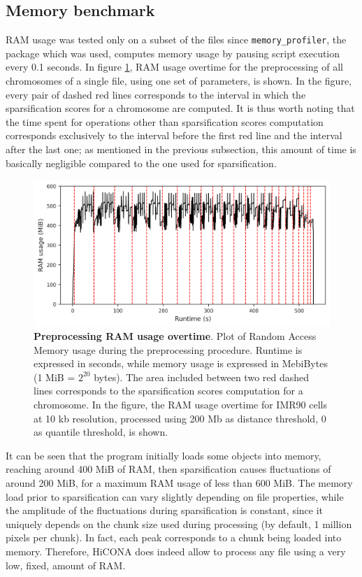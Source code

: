\subsection{Memory benchmark}

RAM usage was tested only on a subset of the files since \texttt{memory\_profiler}, the package which was used, computes memory usage by pausing script execution every 0.1 seconds. In figure \ref{fig:memorybenchmark}, RAM usage overtime for the preprocessing of all chromosomes of a single file, using one set of parameters, is shown. In the figure, every pair of dashed red lines corresponds to the interval in which the sparsification scores for a chromosome are computed. It is thus worth noting that the time spent for operations other than sparsification scores computation corresponds exclusively to the interval before the first red line and the interval after the last one; as mentioned in the previous subsection, this amount of time is basically negligible compared to the one used for sparsification.

\begin{figure}[h]
  \centering 
  \includegraphics[width=1\textwidth]{memory_benchmark.png}
  \caption{\textbf{Preprocessing RAM usage overtime}. Plot of Random Access Memory usage during the preprocessing procedure. Runtime is expressed in seconds, while memory usage is expressed in MebiBytes (1 MiB = $2^{20}$ bytes). The area included between two red dashed lines corresponds to the sparsification scores computation for a chromosome. In the figure, the RAM usage overtime for IMR90 cells at 10 kb resolution, processed using 200 Mb as distance threshold, 0 as quantile threshold, is shown.}
  \label{fig:memorybenchmark}
\end{figure}

It can be seen that the program initially loads some objects into memory, reaching around 400 MiB of RAM, then sparsification causes fluctuations of around 200 MiB, for a maximum RAM usage of less than 600 MiB. The memory load prior to sparsification can vary slightly depending on file properties, while the amplitude of the fluctuations during sparsification is constant, since it uniquely depends on the chunk size used during processing (by default, 1 million pixels per chunk). In fact, each peak corresponds to a chunk being loaded into memory. Therefore, HiCONA does indeed allow to process any file using a very low, fixed, amount of RAM.


